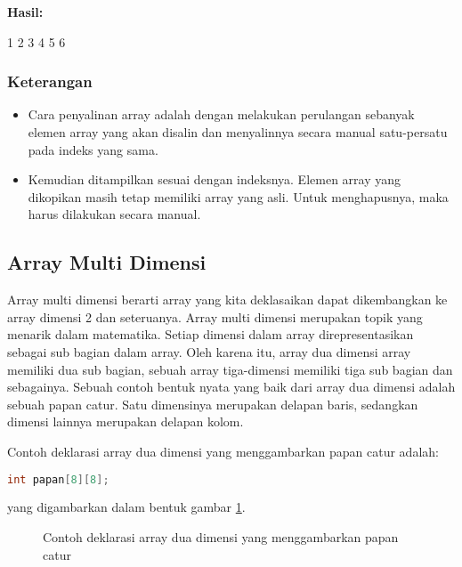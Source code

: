 \textbf{Hasil:}

\begin{lcverbatim}
1
2
3
4
5
6
\end{lcverbatim}

\subsubsection*{Keterangan}

\begin{itemize}

\item
  Cara penyalinan array adalah dengan melakukan perulangan sebanyak
  elemen array yang akan disalin dan menyalinnya secara manual
  satu-persatu pada indeks yang sama.
\item
  Kemudian ditampilkan sesuai dengan indeksnya. Elemen array yang
  dikopikan masih tetap memiliki array yang asli. Untuk menghapusnya,
  maka harus dilakukan secara manual.
\end{itemize}

\subsection{Array Multi Dimensi}\label{array-multi-dimensi}

Array multi dimensi berarti array yang kita deklasaikan dapat
dikembangkan ke array dimensi 2 dan seteruanya. Array multi dimensi
merupakan topik yang menarik dalam matematika. Setiap dimensi dalam
array direpresentasikan sebagai sub bagian dalam array. Oleh karena itu,
array dua dimensi array memiliki dua sub bagian, sebuah array
tiga-dimensi memiliki tiga sub bagian dan sebagainya. Sebuah contoh
bentuk nyata yang baik dari array dua dimensi adalah sebuah papan catur.
Satu dimensinya merupakan delapan baris, sedangkan dimensi lainnya
merupakan delapan kolom.

Contoh deklarasi array dua dimensi yang menggambarkan papan catur
adalah:

\begin{lstlisting}[language=c++, numbers=none]
int papan[8][8];
\end{lstlisting}

yang digambarkan dalam bentuk gambar \ref{fig:gambar3-2}.

\begin{figure}[htbp]
\centering
{}
\caption{Contoh deklarasi array dua dimensi yang menggambarkan papan catur}
\label{fig:gambar3-2}
\end{figure}

